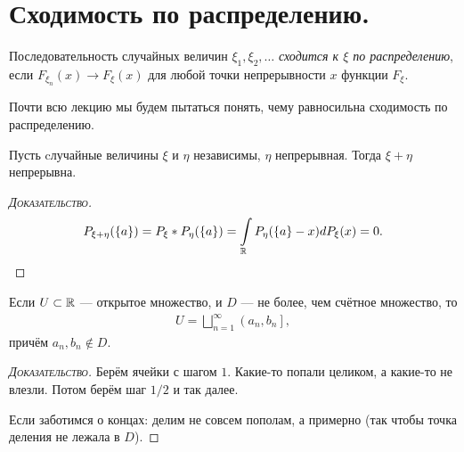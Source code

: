 \documentclass[../main.tex]{subfiles}
\begin{document}
\section{Сходимость по распределению.}
\begin{df}
 Последовательность случайных величин $ \xi_1, \xi_2, \ldots $ \textit{сходится к $ \xi $ по распределению}, если $ F_{\xi_n}(x) \to F_\xi(x) $ для любой точки непрерывности $ x $ функции $ F_\xi $.
\end{df}
Почти всю лекцию мы будем пытаться понять, чему равносильна сходимость по распределению.
\begin{remrk}
  Пусть cлучайные величины $ \xi $ и $ \eta $ независимы, $ \eta $ непрерывная. Тогда $ \xi + \eta $ непрерывна.
\end{remrk}
\begin{proof}[\normalfont\textsc{Доказательство}]
  \begin{align*}
    P_{\xi+\eta}(\left\{ a \right\}) = P_\xi \ast P_\eta(\left\{ a \right\}) = \int\limits_{\mathbb{R}} P_{\eta}(\left\{ a \right\} - x) dP_\xi(x) = 0.
   \end{align*}
  \end{proof}
\begin{remrk}
 Если $ U \subset \mathbb{R} $ --- открытое множество, и $ D $  --- не более, чем счётное множество, то
 \begin{align*}
  U = \bigsqcup_{n=1}^{\infty} \left(a_n, b_n\right],
 \end{align*} причём $ a_n, b_n \notin D $.
\end{remrk}
\begin{proof}[\normalfont\textsc{Доказательство}]
 Берём ячейки с шагом $ 1 $. Какие-то попали целиком, а какие-то не влезли. Потом берём шаг $ 1 / 2 $ и так далее.

 Если заботимся о концах: делим не совсем пополам, а примерно (так чтобы точка деления не лежала в $ D $).
\end{proof}
\end{document}
